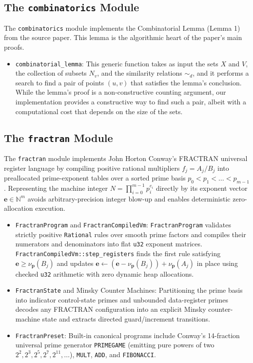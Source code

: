 \documentclass{article}
\begin{document}
\subsection{The \texttt{combinatorics} Module}

The \texttt{combinatorics} module implements the Combinatorial Lemma (Lemma 1) from the source paper. This lemma is the algorithmic heart of the paper's main proofs.

\begin{itemize}
    \item \texttt{combinatorial\_lemma}: This generic function takes as input the sets $X$ and $V$, the collection of subsets $N_v$, and the similarity relations $\sim_d$, and it performs a search to find a pair of points $(u, v)$ that satisfies the lemma's conclusion. While the lemma's proof is a non-constructive counting argument, our implementation provides a constructive way to find such a pair, albeit with a computational cost that depends on the size of the sets.
\end{itemize}

\subsection{The \texttt{fractran} Module}

The \texttt{fractran} module implements John Horton Conway's FRACTRAN universal register language by compiling positive rational multipliers $f_j = A_j / B_j$ into preallocated prime-exponent tables over a sorted prime basis $p_0 < p_1 < \dots < p_{m-1}$. Representing the machine integer $N = \prod_{i=0}^{m-1} p_i^{e_i}$ directly by its exponent vector $\mathbf{e} \in \mathbb{N}^m$ avoids arbitrary-precision integer blow-up and enables deterministic zero-allocation execution.

\begin{itemize}
    \item \texttt{FractranProgram} and \texttt{FractranCompiledVm}: \texttt{FractranProgram} validates strictly positive \texttt{Rational} rules over smooth prime factors and compiles their numerators and denominators into flat \texttt{u32} exponent matrices. \texttt{FractranCompiledVm::step\_registers} finds the first rule satisfying $\mathbf{e} \ge \nu_{\mathbf{p}}(B_j)$ and updates $\mathbf{e} \leftarrow (\mathbf{e} - \nu_{\mathbf{p}}(B_j)) + \nu_{\mathbf{p}}(A_j)$ in place using checked \texttt{u32} arithmetic with zero dynamic heap allocations.
    \item \texttt{FractranState} and Minsky Counter Machines: Partitioning the prime basis into indicator control-state primes and unbounded data-register primes decodes any FRACTRAN configuration into an explicit Minsky counter-machine state and extracts directed guard/increment transitions.
    \item \texttt{FractranPreset}: Built-in canonical programs include Conway's 14-fraction universal prime generator \texttt{PRIMEGAME} (emitting pure powers of two $2^2, 2^3, 2^5, 2^7, 2^{11}, \dots$), \texttt{MULT}, \texttt{ADD}, and \texttt{FIBONACCI}.
\end{itemize}
\end{document}

